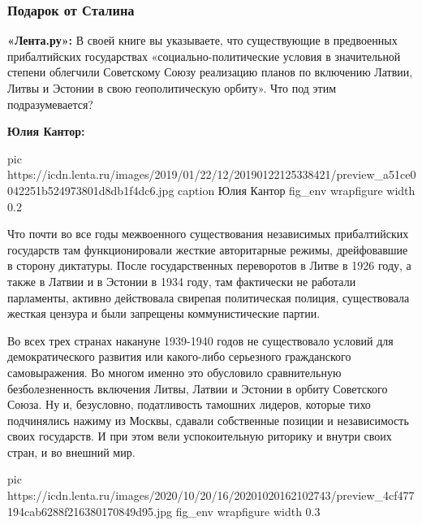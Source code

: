  
 
 
 
 

\subsubsection{Подарок от Сталина}

\textbf{«Лента.ру»:} В своей книге вы указываете, что существующие в предвоенных
прибалтийских государствах «социально-политические условия в значительной
степени облегчили Советскому Союзу реализацию планов по включению Латвии, Литвы
и Эстонии в свою геополитическую орбиту». Что под этим подразумевается?

\textbf{Юлия Кантор:} 

\ifcmt
pic https://icdn.lenta.ru/images/2019/01/22/12/20190122125338421/preview_a51ce0042251b524973801d8db1f4dc6.jpg
caption Юлия Кантор
fig_env wrapfigure
width 0.2
\fi

Что почти во все годы межвоенного существования независимых прибалтийских
государств там функционировали жесткие авторитарные режимы, дрейфовавшие в
сторону диктатуры. После государственных переворотов в Литве в 1926 году, а
также в Латвии и в Эстонии в 1934 году, там фактически не работали парламенты,
активно действовала свирепая политическая полиция, существовала жесткая цензура
и были запрещены коммунистические партии.

Во всех трех странах накануне 1939-1940 годов не существовало условий для
демократического развития или какого-либо серьезного гражданского
самовыражения. Во многом именно это обусловило сравнительную безболезненность
включения Литвы, Латвии и Эстонии в орбиту Советского Союза. Ну и, безусловно,
податливость тамошних лидеров, которые тихо подчинялись нажиму из Москвы,
сдавали собственные позиции и независимость своих государств. И при этом вели
успокоительную риторику и внутри своих стран, и во внешний мир.

\ifcmt
pic https://icdn.lenta.ru/images/2020/10/20/16/20201020162102743/preview_4cf477194cab6288f216380170849d95.jpg
fig_env wrapfigure
width 0.3
\fi


